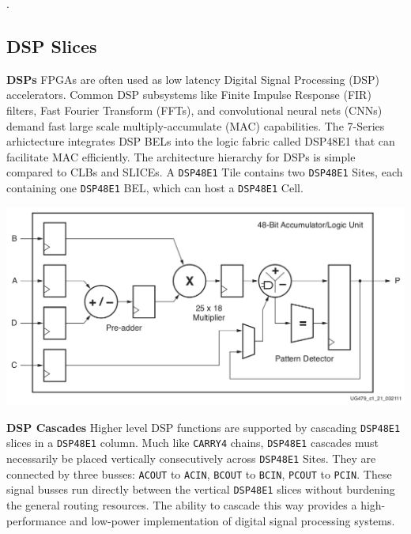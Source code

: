 \documentclass{article}
\begin{document}
        \begin{multicols}{2}
        \vspace{1.0cm}
        .

    \newpage
    \subsection{DSP Slices}

    \textbf{DSPs} \quad 
        FPGAs are often used as low latency Digital Signal Processing (DSP) accelerators. 
        Common DSP subsystems like Finite Impulse Response (FIR) filters, Fast Fourier Transform (FFTs), and convolutional neural nets (CNNs) demand fast large scale multiply-accumulate (MAC) capabilities. 
        The 7-Series arhictecture integrates DSP BELs into the logic fabric called DSP48E1 that can facilitate MAC efficiently. 
        The architecture hierarchy for DSPs is simple compared to CLBs and SLICEs. 
        A \texttt{DSP48E1} Tile contains two \texttt{DSP48E1} Sites, each containing one \texttt{DSP48E1} BEL, which can host a \texttt{DSP48E1} Cell. 

        {
            \centering
            \includegraphics[width=\columnwidth]{figures/dsp_diagram.png}
            \label{dsp_diagram}
        }
        \vspace{0.5cm}

    \textbf{DSP Cascades} \quad 
        Higher level DSP functions are supported by cascading \texttt{DSP48E1} slices in a \texttt{DSP48E1} column.
        Much like \texttt{CARRY4} chains, \texttt{DSP48E1} cascades must necessarily be placed vertically consecutively across \texttt{DSP48E1} Sites. 
        They are connected by three busses: \texttt{ACOUT} to \texttt{ACIN}, \texttt{BCOUT} to \texttt{BCIN}, \texttt{PCOUT} to \texttt{PCIN}.
        These signal busses run directly between the vertical \texttt{DSP48E1} slices without burdening the general routing resources. 
        The ability to cascade this way provides a high-performance and low-power implementation of digital signal processing systems. 


\end{multicols}
\end{document}
